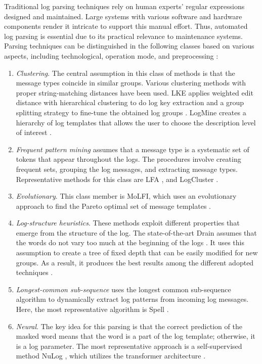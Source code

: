 Traditional log parsing techniques rely on human experts' regular expressions designed and maintained. Large systems with various software and hardware components render it intricate to support this manual effort. Thus, automated log parsing is essential due to its practical relevance to maintenance systems. Parsing techniques can be distinguished in the following classes based on various aspects, including technological, operation mode, and preprocessing \cite{nedelkoski2020self}: 
\begin{enumerate}
\item \textit{Clustering}. The central assumption in this class of methods is that the message types coincide in similar groups. Various clustering methods with proper string-matching distances have been used. LKE applies weighted edit distance with hierarchical clustering to do log key extraction and a group splitting strategy to fine-tune the obtained log groups \cite{fu2009execution}. LogMine creates a hierarchy of log templates that allows the user to choose the description level of interest \cite{hamooni2016logmine}.
\item \textit{Frequent pattern mining} assumes that a message type is a systematic set of tokens that appear throughout the logs. The procedures involve creating frequent sets, grouping the log messages, and extracting message types. Representative methods for this class are LFA \cite{nandi2016anomaly}, and LogCluster \cite{xu2009detecting}.
\item \textit{Evolutionary}. This class member is MoLFI, which uses an evolutionary approach to find the Pareto optimal set of message templates \cite{messaoudi2018search}.
\item \textit{Log-structure heuristics}. These methods exploit different properties that emerge from the structure of the log. The state-of-the-art Drain assumes that the words do not vary too much at the beginning of the logs \cite{he2017drain}. It uses this assumption to create a tree of fixed depth that can be easily modified for new groups. As a result, it produces the best results among the different adopted techniques \cite{zhu2019tools}.
\item \textit{Longest-common sub-sequence} uses the longest common sub-sequence algorithm to dynamically extract log patterns from incoming log messages. Here, the most representative algorithm is Spell \cite{du2016spell}.
\item \textit{Neural}. The key idea for this parsing is that the correct prediction of the masked word means that the word is a part of the log template; otherwise, it is a log parameter. The most representative approach is a self-supervised method NuLog \cite{nedelkoski2020self}, which utilizes the transformer architecture \cite{devlin2018bert}.
\end{enumerate}